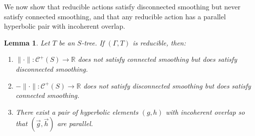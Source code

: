 \documentclass[11pt]{amsart}
\newcommand{\ora}[1]{\overrightarrow{#1}}
\numberwithin{equation}{section}
\numberwithin{figure}{section}
\newtheorem{lemma}[theorem]{Lemma}
\theoremstyle{definition}
\theoremstyle{plain}
\newcommand{\Curves}{\mathcal{C}}
\begin{document}
We now show that reducible actions satisfy disconnected smoothing but never satisfy connected smoothing, and that any reducible action has a parallel hyperbolic pair with incoherent overlap.

\begin{lemma}
Let $T$ be an $S$-tree.
If  $(\Gamma, T)$ is reducible, then:

\begin{enumerate}
    \item $\| \cdot \| \colon \Curves^+(S) \to \mathbb{R}$ does not satisfy connected smoothing but does satisfy disconnected smoothing.
    \item $-\| \cdot \| \colon \Curves^+(S) \to \mathbb{R}$ does not
      satisfy disconnected smoothing but does satisfy connected smoothing.
    \item There exist a pair of hyperbolic elements $(g,h)$ with
      incoherent overlap so that $(\ora{g},\ora{h})$ are parallel.
\end{enumerate}
\label{lem:red_not_smoothing}
\end{lemma}
\end{document}
